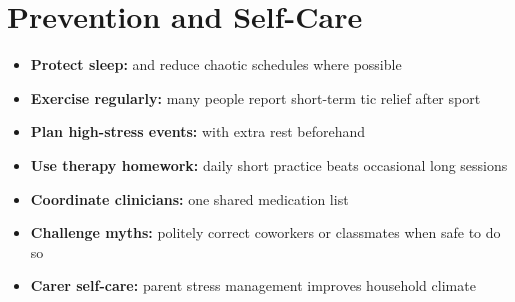 \section*{Prevention and Self-Care}
\begin{itemize}
    \item \textbf{Protect sleep:} and reduce chaotic schedules where possible
    \item \textbf{Exercise regularly:} many people report short-term tic relief after sport
    \item \textbf{Plan high-stress events:} with extra rest beforehand
    \item \textbf{Use therapy homework:} daily short practice beats occasional long sessions
    \item \textbf{Coordinate clinicians:} one shared medication list
    \item \textbf{Challenge myths:} politely correct coworkers or classmates when safe to do so
    \item \textbf{Carer self-care:} parent stress management improves household climate

\end{itemize}
